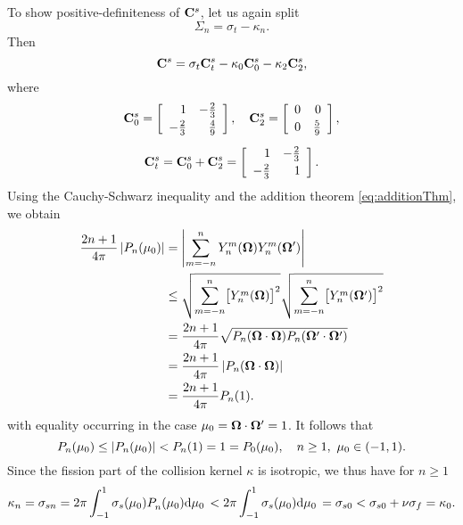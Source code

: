 To show positive-definiteness of $\mat{C}^s$, let us
again split 
$$
	\Sigma_n = \sigma_t - \kappa_n.
$$
Then 
\begin{equation}\label{eq:Cs}
	\mat{C}^s = \sigma_t\mat{C}^s_t - \kappa_0 \mat{C}^s_0 - \kappa_2 \mat{C}^s_2,
\end{equation}
where
\begin{equation}\label{eq:Cs2}
\begin{gathered}
	\mat{C}^s_0 = \left[
\begin{array}{rr}
 1 & -\frac{2}{3} \\[.2em]
 -\frac{2}{3} & \frac{4}{9} \\
\end{array}
\right],\quad
\mat{C}^s_2 = 
\left[
\begin{array}{rr}
 0 & 0 \\[.2em]
 0 & \frac{5}{9} \\
\end{array}
\right],\\[.5em]
\mat{C}^s_t = \mat{C}^s_0 + \mat{C}^s_2 = \left[
\begin{array}{rr}
 1 & -\frac{2}{3} \\[.2em]
 -\frac{2}{3} & 1 \\
\end{array}
\right].
\end{gathered}
\end{equation}
Using the Cauchy-Schwarz inequality and the addition theorem \eqref{eq:additionThm}, we obtain
\begin{equation*}
\begin{aligned}
	\frac{2n+1}{4\pi}\abs{P_n(\mu_0)}&=\abs{\suma[m]{-n}{n}\Y{n}{m}(\bomega)\Y{n}{m}(\bomega')}\\
	&\leq	
	\sqrt{\suma[m]{-n}{n}\bigl[\Y{n}{m}(\bomega)\bigr]^2}\sqrt{\suma[m]{-n}{n}\bigl[\Y{n}{m}(\bomega')\bigr]^2}\\
	&=  \frac{2n+1}{4\pi} \sqrt{P_n(\bomega\cdot\bomega)P_n(\bomega'\cdot\bomega')}\\
	&= 	\frac{2n+1}{4\pi} \abs{P_n(\bomega\cdot\bomega)}\\
	&= 	\frac{2n+1}{4\pi} P_n(1).
\end{aligned}
\end{equation*}
with equality occurring in the case $\mu_0 = \bomega\cdot\bomega' = 1$.
It follows that 
$$
	P_n(\mu_0) \leq \abs{P_n(\mu_0)} < P_n(1) = 1 = P_0(\mu_0),\quad n \geq 1,\ \mu_0\in(-1,1).
$$
Since the fission part of the collision kernel
$\kappa$ is isotropic, we thus have for $n \geq 1$
\begin{equation}\label{eq:kappa_inequality}
	\kappa_n = \sigma_{sn} = 2\pi \muint[_0]{\sigma_s(\mu_0)\P{n}{}(\mu_0)} < 2\pi
	\muint[_0]{\sigma_s(\mu_0)} = \sigma_{s0} < \sigma_{s0} + \nu\sigma_f = \kappa_0. 
\end{equation}
